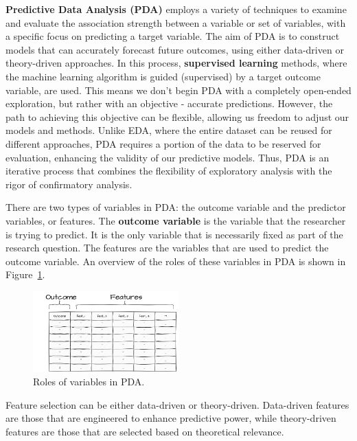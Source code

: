 \documentclass[
  letterpaper,
  DIV=11,
  numbers=noendperiod]{scrreport}
\theoremstyle{definition}
\theoremstyle{remark}
\begin{document}
\textbf{Predictive Data Analysis (PDA)} employs a variety of techniques
to examine and evaluate the association strength between a variable or
set of variables, with a specific focus on predicting a target variable.
The aim of PDA is to construct models that can accurately forecast
future outcomes, using either data-driven or theory-driven approaches.
In this process, \textbf{supervised learning} methods, where the machine
learning algorithm is guided (supervised) by a target outcome variable,
are used. This means we don't begin PDA with a completely open-ended
exploration, but rather with an objective - accurate predictions.
However, the path to achieving this objective can be flexible, allowing
us freedom to adjust our models and methods. Unlike EDA, where the
entire dataset can be reused for different approaches, PDA requires a
portion of the data to be reserved for evaluation, enhancing the
validity of our predictive models. Thus, PDA is an iterative process
that combines the flexibility of exploratory analysis with the rigor of
confirmatory analysis.

There are two types of variables in PDA: the outcome variable and the
predictor variables, or features. The \textbf{outcome variable} is the
variable that the researcher is trying to predict. It is the only
variable that is necessarily fixed as part of the research question. The
features are the variables that are used to predict the outcome
variable. An overview of the roles of these variables in PDA is shown in
Figure~\ref{fig-pda-variables}.

\begin{figure}[H]

{\centering \includegraphics[width=0.5\textwidth,height=\textheight]{figures/aa-pda-variables.drawio.png}

}

\caption{\label{fig-pda-variables}Roles of variables in PDA.}

\end{figure}

Feature selection can be either data-driven or theory-driven.
Data-driven features are those that are engineered to enhance predictive
power, while theory-driven features are those that are selected based on
theoretical relevance.
\end{document}
